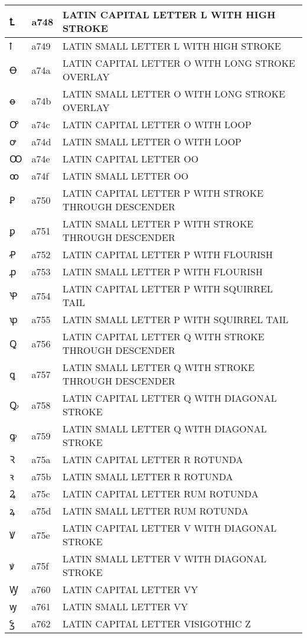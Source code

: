 \documentclass[12pt,letterpaper,openany]{book}
\begin{document}
\begin{center}
\begin{supertabular}{|m{0.25in}|m{0.5in}|m{4in}|}
Ꝉ & a748 & LATIN CAPITAL LETTER L WITH HIGH STROKE\\\hline
ꝉ & a749 & LATIN SMALL LETTER L WITH HIGH STROKE\\\hline
Ꝋ & a74a & LATIN CAPITAL LETTER O WITH LONG STROKE OVERLAY\\\hline
ꝋ & a74b & LATIN SMALL LETTER O WITH LONG STROKE OVERLAY\\\hline
Ꝍ & a74c & LATIN CAPITAL LETTER O WITH LOOP\\\hline
ꝍ & a74d & LATIN SMALL LETTER O WITH LOOP\\\hline
Ꝏ & a74e & LATIN CAPITAL LETTER OO\\\hline
ꝏ & a74f & LATIN SMALL LETTER OO\\\hline
Ꝑ & a750 & LATIN CAPITAL LETTER P WITH STROKE THROUGH DESCENDER\\\hline
ꝑ & a751 & LATIN SMALL LETTER P WITH STROKE THROUGH DESCENDER\\\hline
Ꝓ & a752 & LATIN CAPITAL LETTER P WITH FLOURISH\\\hline
ꝓ & a753 & LATIN SMALL LETTER P WITH FLOURISH\\\hline
Ꝕ & a754 & LATIN CAPITAL LETTER P WITH SQUIRREL TAIL\\\hline
ꝕ & a755 & LATIN SMALL LETTER P WITH SQUIRREL TAIL\\\hline
Ꝗ & a756 & LATIN CAPITAL LETTER Q WITH STROKE THROUGH DESCENDER\\\hline
ꝗ & a757 & LATIN SMALL LETTER Q WITH STROKE THROUGH DESCENDER\\\hline
Ꝙ & a758 & LATIN CAPITAL LETTER Q WITH DIAGONAL STROKE\\\hline
ꝙ & a759 & LATIN SMALL LETTER Q WITH DIAGONAL STROKE\\\hline
Ꝛ & a75a & LATIN CAPITAL LETTER R ROTUNDA\\\hline
ꝛ & a75b & LATIN SMALL LETTER R ROTUNDA\\\hline
Ꝝ & a75c & LATIN CAPITAL LETTER RUM ROTUNDA\\\hline
ꝝ & a75d & LATIN SMALL LETTER RUM ROTUNDA\\\hline
Ꝟ & a75e & LATIN CAPITAL LETTER V WITH DIAGONAL STROKE\\\hline
ꝟ & a75f & LATIN SMALL LETTER V WITH DIAGONAL STROKE\\\hline
Ꝡ & a760 & LATIN CAPITAL LETTER VY\\\hline
ꝡ & a761 & LATIN SMALL LETTER VY\\\hline
Ꝣ & a762 & LATIN CAPITAL LETTER VISIGOTHIC Z\\\hline

\end{supertabular}
\end{center}
\end{document}
